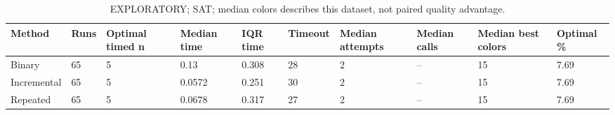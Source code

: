 \begin{table}[htbp]
\centering
\caption{EXPLORATORY; SAT; median colors describes this dataset, not paired quality advantage.}
\label{tab:p2a-SAT-exploratory-methods}
\begin{tabular}{llllllllll}
\hline
Method & Runs & Optimal timed n & Median time & IQR time & Timeout & Median attempts & Median calls & Median best colors & Optimal \% \\
\hline
Binary & 65 & 5 & 0.13 & 0.308 & 28 & 2 & -- & 15 & 7.69 \\
Incremental & 65 & 5 & 0.0572 & 0.251 & 30 & 2 & -- & 15 & 7.69 \\
Repeated & 65 & 5 & 0.0678 & 0.317 & 27 & 2 & -- & 15 & 7.69 \\
\hline
\end{tabular}
\end{table}

